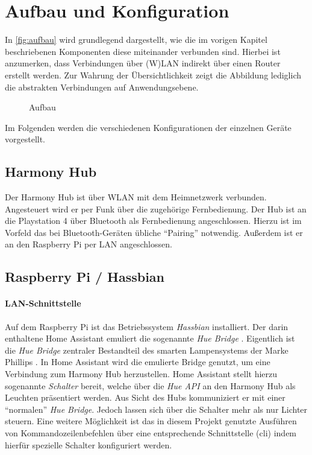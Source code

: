 \newpage
\section{Aufbau und Konfiguration}\label{sec:aufbau}
In \autoref{fig:aufbau} wird grundlegend dargestellt,
wie die im vorigen Kapitel beschriebenen Komponenten diese miteinander verbunden sind.
Hierbei ist anzumerken, dass Verbindungen über (W)LAN indirekt über einen Router erstellt werden.
Zur Wahrung der Übersichtlichkeit zeigt die Abbildung
 lediglich die abstrakten Verbindungen auf Anwendungsebene.

\begin{figure}[ht!]
    \centering
    \resizebox{\textwidth}{!}{
        
    }
    \caption{Aufbau}
    \label{fig:aufbau}
\end{figure}

Im Folgenden werden die verschiedenen Konfigurationen der einzelnen Geräte vorgestellt.

\subsection{Harmony Hub}\label{sec:aufbau-hub}
Der Harmony Hub ist über WLAN mit dem Heimnetzwerk verbunden.
Angesteuert wird er per Funk über die zugehörige Fernbedienung.
Der Hub ist an die Playstation 4 über Bluetooth als Fernbedienung angeschlossen.
Hierzu ist im Vorfeld das bei Bluetooth-Geräten übliche \enquote{Pairing} notwendig.
Außerdem ist er an den Raspberry Pi per LAN angeschlossen.

\subsection{Raspberry Pi / Hassbian}\label{sec:aufbau-hassbian}

\paragraph{LAN-Schnittstelle}
Auf dem Raspberry Pi ist das Betriebssystem \textit{Hassbian} installiert.
Der darin enthaltene Home Assistant emuliert die sogenannte \textit{Hue Bridge} \cite{Emulated83:online}.
Eigentlich ist die \textit{Hue Bridge} zentraler Bestandteil des smarten Lampensystems der Marke Phillips \cite{HueBridg65:online}.
In Home Assistant wird die emulierte Bridge genutzt, um eine Verbindung zum Harmony Hub herzustellen.
Home Assistant stellt hierzu sogenannte \textit{Schalter} bereit, welche über die \textit{Hue API} an den Harmony Hub als Leuchten präsentiert werden.
Aus Sicht des Hubs kommuniziert er mit einer \enquote{normalen} \textit{Hue Bridge}.
Jedoch lassen sich über die Schalter mehr als nur Lichter steuern.
Eine weitere Möglichkeit ist das in diesem Projekt genutzte Ausführen von Kommandozeilenbefehlen über eine entsprechende Schnittstelle (\ac{cli})
indem hierfür spezielle Schalter konfiguriert werden.

